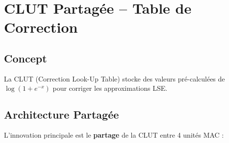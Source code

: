 \documentclass[12pt,a4paper]{article}
\begin{document}
\section{CLUT Partagée -- Table de Correction}

\subsection{Concept}

La CLUT (Correction Look-Up Table) stocke des valeurs pré-calculées de $\log(1 + e^{-x})$ pour corriger les approximations LSE.

\subsection{Architecture Partagée}

L'innovation principale est le \textbf{partage} de la CLUT entre 4 unités MAC :
\end{document}
